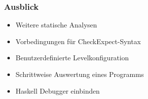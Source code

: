 \begin{frame}
	\frametitle{Ausblick}
	\begin{itemize}
		\item{Weitere statische Analysen}
		\item{Vorbedingungen für CheckExpect-Syntax}
		\item{Benutzerdefinierte Levelkonfiguration}
		\item{Schrittweise Auswertung eines Programms}
		\item{Haskell Debugger einbinden}
	\end{itemize}
\end{frame}